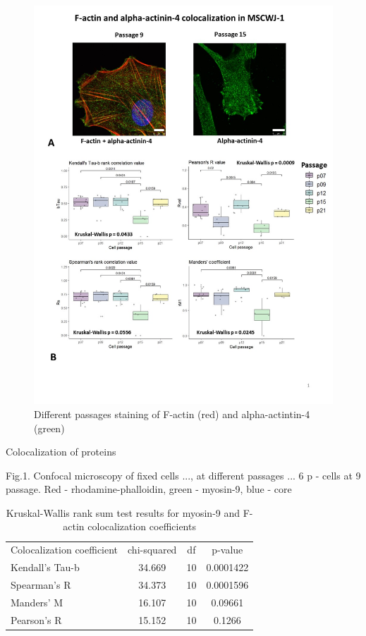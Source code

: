 \documentclass[english,authoryear]{elsarticle}
\begin{document}
\begin{figure}[hbt!]
\centering
\includegraphics[width=0.9\linewidth]{fig_a4-actin-col.jpg}
\caption{Different passages staining of F-actin (red) and alpha-actintin-4 (green)}
\label{a4-actin-col}
\end{figure}

Colocalization of proteins




Fig.1. Confocal microscopy of fixed cells ..., at different passages ... 6 p - cells at 9 passage. Red - rhodamine-phalloidin, green - myosin-9, blue - core




\begin{table}
  \caption{Kruskal-Wallis rank sum test results for myosin-9 and F-actin colocalization coefficients}
  \label{tab1}
\centering
\begin{tabular}{l|ccc}
 Colocalization coefficient & chi-squared & df & p-value  \\
 Kendall's Tau-b & 34.669 & 10 & 0.0001422 \\
 Spearman's R & 34.373 & 10 &  0.0001596 \\
 Manders' M & 16.107 & 10 & 0.09661 \\
 Pearson's R & 15.152 & 10 & 0.1266

\end{tabular}
\end{table}
\end{document}

